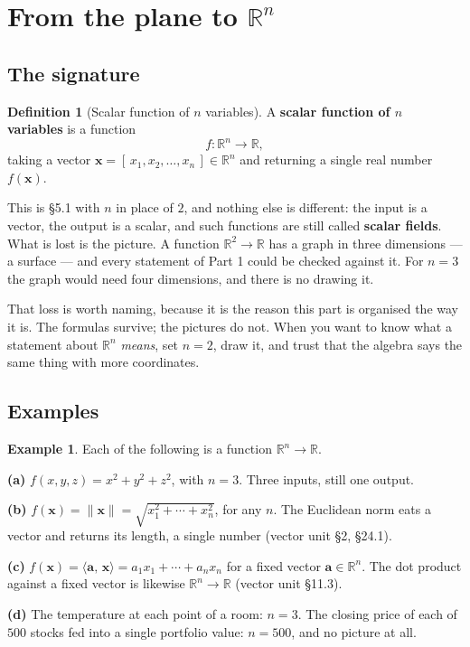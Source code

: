 \documentclass[11pt]{article}
\theoremstyle{plain}
\theoremstyle{definition}
\newtheorem{defn}{Definition}[section]
\newtheorem{ex}{Example}[section]
\theoremstyle{remark}
\newcommand{\R}{\mathbb{R}}
\newcommand{\vc}[1]{\mathbf{#1}}
\newcommand{\norm}[1]{\lVert #1\rVert}
\newcommand{\ip}[2]{\langle #1,\, #2\rangle}
\begin{document}
\section{From the plane to \texorpdfstring{$\R^{n}$}{Rn}}

\subsection{The signature}
\begin{defn}[Scalar function of $n$ variables]
A \textbf{scalar function of $n$ variables} is a function
\[
  f:\R^{n}\longrightarrow\R ,
\]
taking a vector $\vc{x}=[\,x_1,x_2,\dots,x_n\,]\in\R^{n}$ and returning a single
real number $f(\vc{x})$.
\end{defn}

\noindent This is \S5.1 with $n$ in place of $2$, and nothing else is different:
the input is a vector, the output is a scalar, and such functions are still
called \textbf{scalar fields}. What is lost is the picture. A function
$\R^{2}\to\R$ has a graph in three dimensions --- a surface --- and every
statement of Part 1 could be checked against it. For $n=3$ the graph would need
four dimensions, and there is no drawing it.

That loss is worth naming, because it is the reason this part is organised the
way it is. The formulas survive; the pictures do not. When you want to know what
a statement about $\R^{n}$ \emph{means}, set $n=2$, draw it, and trust that the
algebra says the same thing with more coordinates.

\subsection{Examples}
\begin{ex}
Each of the following is a function $\R^{n}\to\R$.

\smallskip
\noindent\textbf{(a)} $f(x,y,z)=x^{2}+y^{2}+z^{2}$, with $n=3$. Three inputs,
still one output.

\smallskip
\noindent\textbf{(b)} $f(\vc{x})=\norm{\vc{x}}=\sqrt{x_1^{2}+\cdots+x_n^{2}}$,
for any $n$. The Euclidean norm eats a vector and returns its length, a single
number (vector unit \S2, \S24.1).

\smallskip
\noindent\textbf{(c)} $f(\vc{x})=\ip{\vc{a}}{\vc{x}}=a_1x_1+\cdots+a_nx_n$ for a
fixed vector $\vc{a}\in\R^{n}$. The dot product against a fixed vector is
likewise $\R^{n}\to\R$ (vector unit \S11.3).

\smallskip
\noindent\textbf{(d)} The temperature at each point of a room: $n=3$. The
closing price of each of $500$ stocks fed into a single portfolio value:
$n=500$, and no picture at all.
\end{ex}
\end{document}
